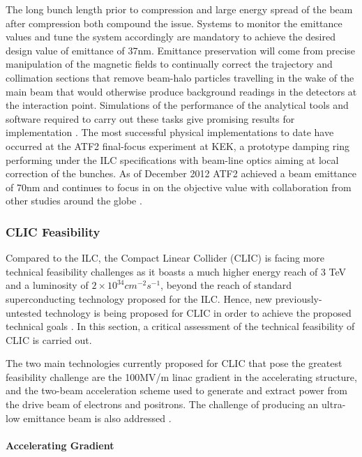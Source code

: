 The long bunch length prior to compression and large energy spread of the beam after compression both compound the issue. Systems to monitor the emittance values and tune the system accordingly are mandatory to achieve the desired design value of emittance of 37nm. Emittance preservation will come from precise manipulation of the magnetic fields to continually correct the trajectory and collimation sections that remove beam-halo particles travelling in the wake of the main beam that would otherwise produce background readings in the detectors at the interaction point. Simulations of the performance of the analytical tools and software required to carry out these tasks give promising results for implementation \cite{PAC:Emittance}. The most successful physical implementations to date have occurred at the ATF2 final-focus experiment at KEK, a prototype damping ring performing under the ILC specifications with beam-line optics aiming at local correction of the bunches. As of December 2012 ATF2 achieved a beam emittance of 70nm and continues to focus in on the objective value with collaboration from other studies around the globe \cite{ATF2}.

\subsubsection{CLIC Feasibility}

Compared to the ILC, the Compact Linear Collider (CLIC) is facing more technical feasibility challenges as it boasts a much higher energy reach of 3 TeV and a luminosity of $2 \times 10^{34} cm^{-2} s^{-1}$, beyond the reach of standard superconducting technology proposed for the ILC. Hence, new previously-untested technology is being proposed for CLIC in order to achieve the proposed technical goals \cite{CLIC:ArticleSymmetry}. In this section, a critical assessment of the technical feasibility of CLIC is carried out.

The two main technologies currently proposed for CLIC that pose the greatest feasibility challenge are the 100MV/m linac gradient in the accelerating structure, and the two-beam acceleration scheme used to generate and extract power from the drive beam of electrons and positrons. The challenge of producing an ultra-low emittance beam is also addressed \cite{CLIC:Concept}.

\paragraph{Accelerating Gradient}

